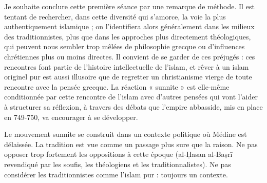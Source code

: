 Je souhaite conclure cette première séance par une remarque de méthode.
Il est tentant de rechercher, dans cette diversité qui s'amorce, la voie
la plus authentiquement islamique ; on l'identifiera alors généralement
dans les milieux des traditionnistes, plus que dans les approches plus
directement théologiques, qui peuvent nous sembler trop mêlées de
philosophie grecque ou d'influences chrétiennes plus ou moins directes.
Il convient de se garder de ces préjugés : ces rencontres font partie de
l'histoire intellectuelle de l'islam, et rêver à un islam originel pur
est aussi illusoire que de regretter un christianisme vierge de toute
rencontre avec la pensée grecque. La réaction « sunnite » est elle-même
conditionnée par cette rencontre de l'islam avec d'autres pensées qui
vont l'aider à structurer sa réflexion, à travers des débats que
l'empire abbasside, mis en place en 749-750, va encourager à se
développer.
\begin{Synthesis}
Le mouvement sunnite se construit dans un contexte politique où Médine est délaissée. La tradition est vue comme un passage plus sure que la raison. Ne pas opposer trop fortement les oppositions à cette époque (al-Ḥasan al-Baṣrī revendiqué par les soufis, les théologiens et les traditionnalistes). Ne pas considérer les traditionnistes comme l'islam pur : toujours un contexte.
\end{Synthesis}
